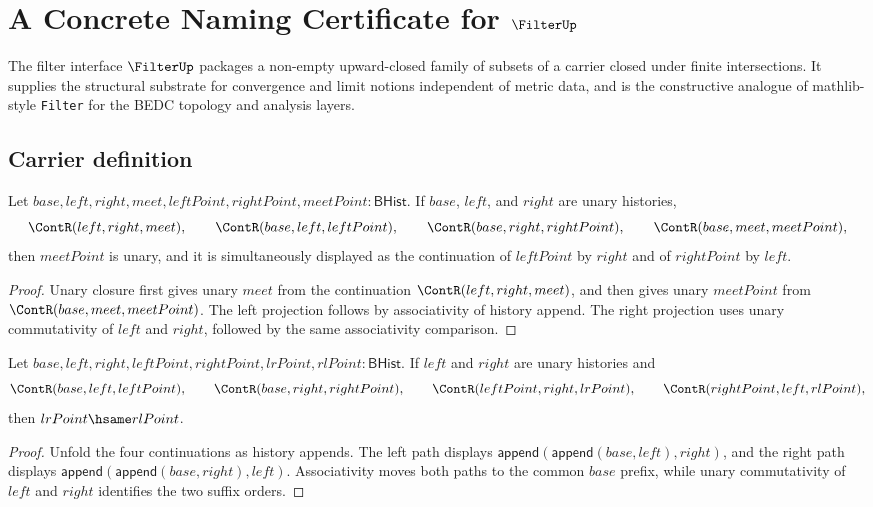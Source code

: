 \chapter{A Concrete Naming Certificate for $\FilterUp$}
\label{ch:concrete-instances-filter-namecert}

The filter interface $\FilterUp$ packages a non-empty upward-closed family of subsets of a carrier closed under finite intersections. It supplies the structural substrate for convergence and limit notions independent of metric data, and is the constructive analogue of mathlib-style \texttt{Filter} for the BEDC topology and analysis layers.

\section{Carrier definition}
\label{sec:filter-carrier}

\begin{theorem}
\label{thm:filter-principal-suffix-unary-intersection-closed}
Let $base,left,right,meet,leftPoint,rightPoint,meetPoint:\mathsf{BHist}$.
If $base$, $left$, and $right$ are unary histories,
$$
\ContR(left,right,meet),\qquad
\ContR(base,left,leftPoint),\qquad
\ContR(base,right,rightPoint),\qquad
\ContR(base,meet,meetPoint),
$$
then $meetPoint$ is unary, and it is simultaneously displayed as the
continuation of $leftPoint$ by $right$ and of $rightPoint$ by $left$.
\end{theorem}
\begin{proof}
Unary closure first gives unary $meet$ from the continuation
$\ContR(left,right,meet)$, and then gives unary $meetPoint$ from
$\ContR(base,meet,meetPoint)$. The left projection follows by associativity of
history append. The right projection uses unary commutativity of $left$ and
$right$, followed by the same associativity comparison.
\end{proof}

\begin{theorem}
\label{thm:filter-principal-suffix-unary-commuting-square}
Let $base,left,right,leftPoint,rightPoint,lrPoint,rlPoint:\mathsf{BHist}$.
If $left$ and $right$ are unary histories and
$$
\ContR(base,left,leftPoint),\qquad
\ContR(base,right,rightPoint),\qquad
\ContR(leftPoint,right,lrPoint),\qquad
\ContR(rightPoint,left,rlPoint),
$$
then $lrPoint\hsame rlPoint$.
\end{theorem}
\begin{proof}
Unfold the four continuations as history appends. The left path displays
$\mathsf{append}(\mathsf{append}(base,left),right)$, and the right path
displays $\mathsf{append}(\mathsf{append}(base,right),left)$. Associativity
moves both paths to the common $base$ prefix, while unary commutativity of
$left$ and $right$ identifies the two suffix orders.
\end{proof}

